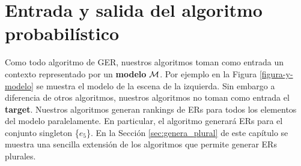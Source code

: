 \section{Entrada y salida del algoritmo probabil\'istico}
\label{input_algo}
Como todo algoritmo de GER, nuestros algoritmos toman como entrada un contexto representado por un \textbf{modelo} $\mathcal{M}$. Por ejemplo en la Figura \ref{figura-y-modelo} se muestra el modelo de la escena de la izquierda. Sin embargo a diferencia de otros algoritmos, nuestros algoritmos no toman como entrada el \textbf{target}. Nuestros algoritmos generan rankings de ERs para todos los elementos del modelo paralelamente. En particular, el algoritmo generar\'a ERs para el conjunto singleton \{$e_5$\}. En la Secci\'on \ref{sec:genera_plural} de este cap\'itulo se muestra una sencilla extensi\'on de los algoritmos que permite generar ERs plurales.
